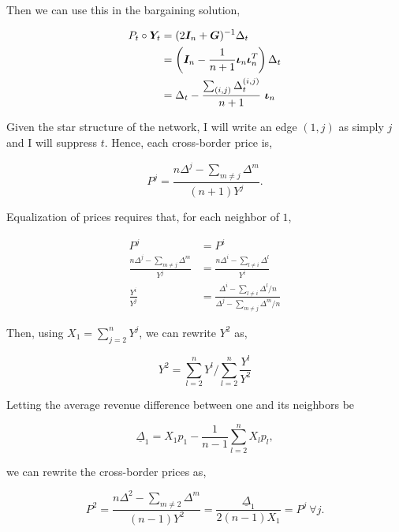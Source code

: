 Then we can use this in the bargaining solution,

\begin{equation*}
  \begin{split}
    P_t \circ \Y_t &= (2\I_n + \G)^{-1} \Delta_t \\
    &= \left( \I_n - \frac{1}{n + 1} \matr{\iota}_n \matr{\iota}_n^T \right) \Delta_t \\
    &= \Delta_t - \frac{\sum_{(i, j)} \Delta^{(i, j)}_t}{n+1} \ \matr{\iota}_n
  \end{split}
\end{equation*}

Given the star structure of the network, I will write an edge $(1, j)$ as simply $j$ and I will suppress $t$. Hence, each cross-border price is,

\begin{equation*}
  P^j = \frac{n\Delta^j - \sum_{m \neq j} \Delta^m }{(n + 1)Y^j}.
\end{equation*}

Equalization of prices requires that, for each neighbor of $1$,

\begin{equation*}
  \begin{split}
    P^j &= P^i \\
    \frac{n\Delta^j - \sum_{m \neq j} \Delta^m }{Y^j} &= \frac{n\Delta^i - \sum_{l \neq i} \Delta^l}{Y^i} \\
    \frac{Y^i}{Y^j} &= \frac{\Delta^i - \sum_{l \neq i} \Delta^l / n}{\Delta^j - \sum_{m \neq j} \Delta^m / n}
  \end{split}
\end{equation*}

Then, using $X_1 = \sum^n_{j = 2} Y^j$, we can rewrite $Y^2$ as,

\begin{equation*}
  Y^2 = \sum^n_{l = 2} Y^l \Big/ \sum^n_{l = 2} \frac{Y^l}{Y^2}
\end{equation*}

Letting the average revenue difference between one and its neighbors be

\begin{equation*}
  \underline{\Delta}_1 = X_1 p_1 - \frac{1}{n-1} \sum^n_{l = 2} X_l p_l,
\end{equation*}

we can rewrite the cross-border prices as,

\begin{equation*}
  P^2 = \frac{n \Delta^2 - \sum_{m \neq 2} \Delta^m}{(n-1) Y^2} = \frac{\underline{\Delta}_1}{2 (n-1) X_1} = P^j \ \forall j.
\end{equation*}

